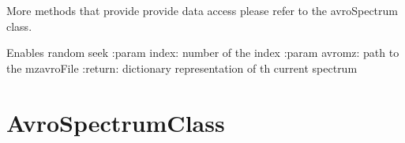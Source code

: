 \documentclass[letterpaper,10pt,english]{sphinxmanual}
\begin{document}
\begin{fulllineitems}
\begin{description}
\end{description}

More methods that provide provide data access please refer to the avroSpectrum class.

\begin{fulllineitems}
\label{reader:reader.PymzAvroReader.rndSeek}
Enables random seek
:param index: number of the index
:param avromz: path to the mzavroFile
:return: dictionary representation of th current spectrum

\end{fulllineitems}


\end{fulllineitems}



\chapter{AvroSpectrumClass}
\label{avroSpectrum:avrospectrumclass}\label{avroSpectrum:module-avroSpectrum}\label{avroSpectrum::doc}
\end{document}
